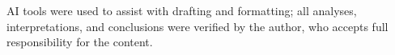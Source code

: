 
AI tools were used to assist with drafting and formatting; all analyses, interpretations, and conclusions were verified by the author, who accepts full responsibility for the content.